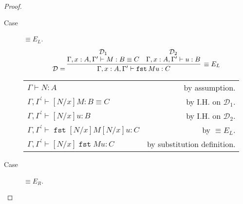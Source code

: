 \documentclass[11pt,letterpaper]{article}
\DeclareMathOperator{\fst}{\mathtt{fst}}
\newcommand{\proves}{\vdash}
\begin{document}
\begin{enumerate}
\begin{proof}
\begin{description}
                \item[Case] $\equiv E_L$.
                    $$
                    \mathcal{D} = \infer[\equiv E_L]{
                        \Gamma, x:A, \Gamma^\prime
                        \proves
                        \fst M u : C
                    }{
                        \deduce[\mathcal{D}_1]{
                            \Gamma, x:A, \Gamma^\prime
                            \proves
                            M : B \equiv C
                        }{}
                        &
                        \deduce[\mathcal{D}_2]{
                            \Gamma, x:A, \Gamma^\prime
                            \proves
                            u : B
                        }{}
                    }
                    $$

                    \begin{center}
                        \begin{tabular}{l r}
                            $\Gamma \proves N : A$
                            &
                            by assumption. \\
                            $
                            \Gamma, \Gamma^\prime
                            \proves
                            [N/x]M : B \equiv C
                            $
                            &
                            by I.H. on $\mathcal{D}_1$. \\
                            $
                            \Gamma, \Gamma^\prime
                            \proves
                            [N/x]u : B
                            $
                            &
                            by I.H. on $\mathcal{D}_2$. \\
                            $
                            \Gamma, \Gamma^\prime
                            \proves
                            \fst [N/x]M [N/x]u : C
                            $
                            &
                            by $\equiv E_L$. \\
                            $
                            \Gamma, \Gamma^\prime
                            \proves
                            [N/x] \fst M u : C
                            $
                            &
                            by substitution definition.
                        \end{tabular}
                    \end{center}

                \item[Case] $\equiv E_R$.


\end{description}
\end{proof}
\end{enumerate}
\end{document}
